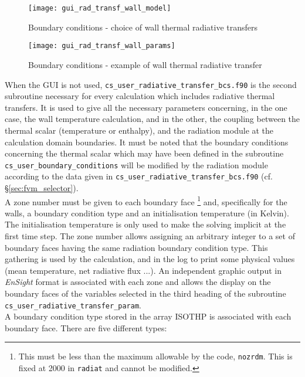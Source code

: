 {{{\begin{figure}[ht]
\begin{center}
\texttt{[image: gui\_rad\_transf\_wall\_model]}
\caption{Boundary conditions - choice of wall thermal radiative transfers}
\label{fig:6_ray}
\end{center}
\end{figure}

\begin{figure}[ht]
\begin{center}
\texttt{[image: gui\_rad\_transf\_wall\_params]}
\caption{Boundary conditions - example of wall thermal radiative transfer}
\label{fig:7_ray}
\end{center}
\end{figure}

When the GUI is not used, \texttt{cs\_user\_radiative\_transfer\_bcs.f90} is the second subroutine necessary for
every calculation which includes radiative thermal transfers. It is used to give all the
necessary parameters concerning, in the one case, the wall temperature
calculation, and in the other, the coupling between the thermal
scalar (temperature or enthalpy), and the radiation module at the
calculation domain boundaries. It must be noted that the boundary conditions
concerning the thermal scalar which may have been defined in the
subroutine \texttt{cs\_user\_boundary\_conditions} will be modified by the radiation module
according to the data given in \texttt{cs\_user\_radiative\_transfer\_bcs.f90} (cf. \S\ref{sec:fvm_selector}).\\
A zone number must be given to each boundary face \footnote{This must be less
 than the maximum allowable by the code, \texttt{nozrdm}. This is fixed at 2000
 in \texttt{radiat} and cannot be modified.} and, specifically for
the walls, a boundary condition type and an initialisation temperature
(in Kelvin). The initialisation temperature is only used to make the
solving implicit at the first time step. The zone number allows assigning
an arbitrary integer to a set of boundary faces having the same
radiation boundary condition type. This gathering is used by the
calculation, and in the log to print some physical values (mean
temperature, net radiative flux ...). An independent graphic output in
{\em EnSight} format is associated with each zone and allows the display on
the boundary faces of the variables selected in the third heading of the
subroutine \texttt{cs\_user\_radiative\_transfer\_param}.\\
A boundary condition type stored in the array ISOTHP is associated with
each boundary face. There are five different types:

}}}
